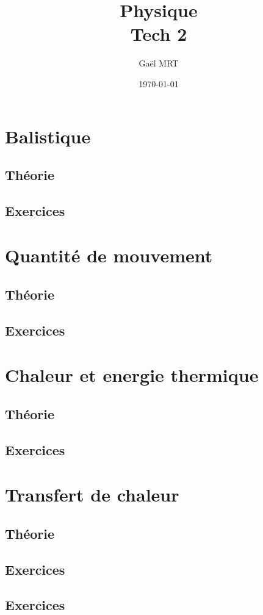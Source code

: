 \documentclass{report}
\title{Physique \\ Tech 2}
\author{Gaël MRT}
\date{\today}
\begin{document}
\maketitle

\tableofcontents
\thispagestyle{fancy}

\chapter{Balistique}
\thispagestyle{fancy}
\section{Théorie}

\section{Exercices}




\newpage
\chapter{Quantité de mouvement}
\thispagestyle{fancy}
\section{Théorie}



\section{Exercices}



\chapter{Chaleur et energie thermique}
\section{Théorie}



\section{Exercices}




\chapter{Transfert de chaleur}
\section{Théorie}



\section{Exercices}






\section{Exercices}

\end{document}
